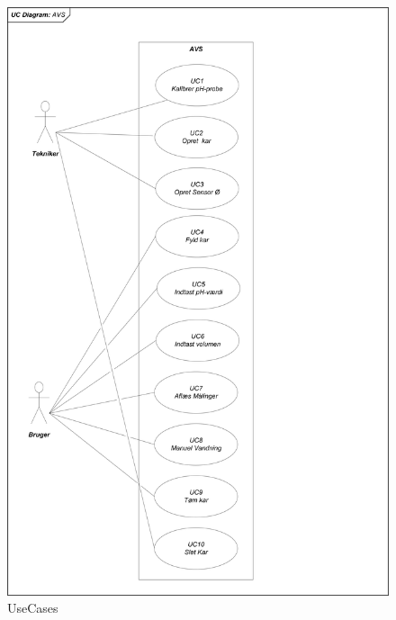 \begin{figure}[H]
	\centering
	\includegraphics[scale=0.6]{systembeskrivelse/AVS_UseCases}
	\caption{UseCases}
	\label{photo:UseCases}
\end{figure}
